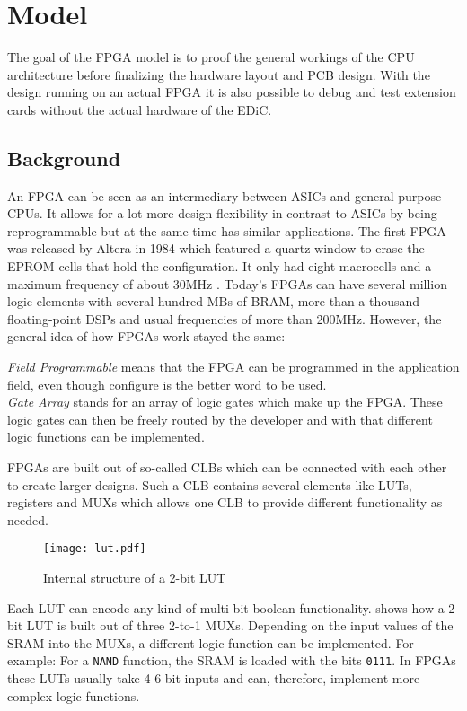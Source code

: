 \chapter{ Model}\label{cha:fpga}
The goal of the \gls{FPGA} model is to proof the general workings of the \gls{CPU} architecture before finalizing the hardware layout and \gls{PCB} design.
With the design running on an actual \gls{FPGA} it is also possible to debug and test extension cards without the actual hardware of the \gls{EDiC}.


\section{ Background}
An \gls{FPGA} can be seen as an intermediary between \glspl{ASIC} and general purpose \glspl{CPU}.
It allows for a lot more design flexibility in contrast to \glspl{ASIC} by being reprogrammable but at the same time has similar applications.
The first \gls{FPGA} was released by Altera in 1984 which featured a quartz window to erase the \gls{EPROM} cells that hold the configuration.
It only had eight macrocells and a maximum frequency of about 30MHz \cite{ref:altera_databook}.
Today's \glspl{FPGA} can have several million logic elements with several hundred MBs of \gls{BRAM}, more than a thousand floating-point \glspl{DSP} and usual frequencies of more than 200MHz.
However, the general idea of how \glspl{FPGA} work stayed the same:

\emph{Field Programmable} means that the \gls{FPGA} can be programmed in the application field, even though configure is the better word to be used.\\
\emph{Gate Array} stands for an array of logic gates which make up the \gls{FPGA}.
These logic gates can then be freely routed by the developer and with that different logic functions can be implemented.

\glspl{FPGA} are built out of so-called \glspl{CLB} which can be connected with each other to create larger designs.
Such a \gls{CLB} contains several elements like \glspl{LUT}, registers and \glspl{MUX} which allows one \gls{CLB} to provide different functionality as needed.
\begin{figure}
  \centering
  \texttt{[image: lut.pdf]}
  \caption{Internal structure of a 2-bit \gls{LUT}}
  \label{fig:lut}
\end{figure}
Each \gls{LUT} can encode any kind of multi-bit boolean functionality.
 shows how a 2-bit \gls{LUT} is built out of three 2-to-1 \glspl{MUX}.
Depending on the input values of the \gls{SRAM} into the \glspl{MUX}, a different logic function can be implemented.
For example: For a \texttt{NAND} function, the \gls{SRAM} is loaded with the bits \texttt{0111}.
In \glspl{FPGA} these \glspl{LUT} usually take 4-6 bit inputs and can, therefore, implement more complex logic functions.

